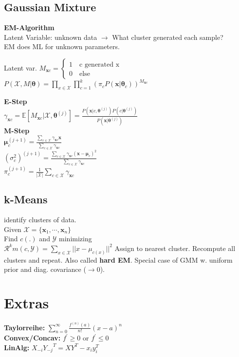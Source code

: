 \subsection*{Gaussian Mixture}
\textbf{EM-Algorithm}\\
Latent Variable: unknown data $\rightarrow$ What cluster generated each sample?\\
EM does ML for unknown parameters.

Latent var. $M_{\mathbf{x}c}{=}\begin{cases} 
       1 \quad \text{c generated x}\\
       0 \quad \text{else}
       \end{cases} 
$\\
$P(\mathcal{X}, M|\mathbf{\theta}){=}\prod_{x\in\mathcal{X}}\prod_{c=1}^k(\pi_cP(\mathbf{x}|\mathbf{\theta}_c))^{M_{\mathbf{x}c}}$

\textbf{E-Step}\\
$ \gamma_{\mathbf{x}c}{=}\mathbb{E}[M_{\mathbf{x}c}|\mathcal{X},\mathbf{\theta}^{(j)}]{=}\frac{P(\mathbf{x}|c,\mathbf{\theta}^{(j)})P(c|\mathbf{\theta}^{(j)})}{P(\mathbf{x}|\mathbf{\theta}^{(j)})}$\\
\textbf{M-Step}\\
$\mathbf{\mu}_c^{(j+1)}=\frac{\sum_{c\in\mathcal{X}}\gamma_{\mathbf{x}c}\mathbf{x}}{\sum_{c\in\mathcal{X}}\gamma_{\mathbf{x}c}}$\\
$(\sigma_c^2)^{(j+1)}=\frac{\sum_{c\in\mathcal{X}}\gamma_{\mathbf{x}c}(\mathbf{x}-\mathbf{\mu}_c)^2}{\sum_{c\in\mathcal{X}}\gamma_{\mathbf{x}c}}$\\
$\pi_c^{(j+1)}=\frac{1}{|\mathcal{X}|}\sum_{c\in\mathcal{X}}\gamma_{\mathbf{x}c}$\\

\subsection*{k-Means}
identify clusters of data.\\
Given $\mathcal{X}=\{\mathbf{x}_1,\cdots,\mathbf{x}_n\}$\\
Find $c(.)$ and $\mathcal{Y}$ minimizing\\
$\mathcal{R}^km(c,\mathcal{Y})=\sum_{x\in\mathcal{X}}||x-\mu_{c(x)}||^2$
Assign to nearest cluster. Recompute all clusters and repeat. Also called \textbf{hard EM}. Special case of GMM w. uniform prior and diag. covariance ($\rightarrow 0$).

\section*{Extras} 
\textbf{Taylorreihe:} $\sum_{n=0}^{\infty}\frac{f^{(n)}(a)}{n!}(x-a)^n$\\
\textbf{Convex/Concav:} $f^{'}\geq0$ or $f^{'}\leq0$\\
\textbf{LinAlg:} $X_{-i}{Y_{-j}}^T = XY^T - x_i y_i^T$\\
\\
\\
\\
\\
\\
\\
\\
\\